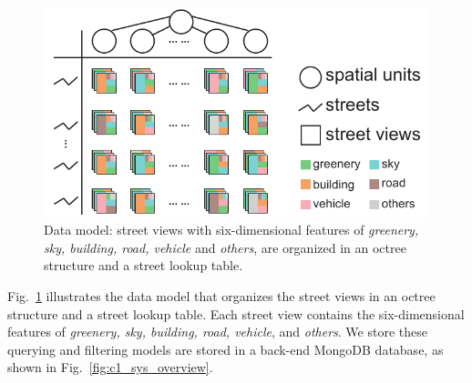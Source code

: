 \begin{figure}[h]
	\centering
	\includegraphics[width=0.8\columnwidth]{figure/streetvizor/fig4_data_model/data_model}
	\vspace{-3mm}
	\caption{Data model: street views with six-dimensional features of \textit{greenery, sky, building, road, vehicle} and \textit{others}, are organized in an octree structure and a street lookup table.}
	\vspace{-1mm}
	\label{fig:c1_data_model}
\end{figure}
\vspace*{-2mm}

Fig.~\ref{fig:c1_data_model} illustrates the data model that organizes the street views in an octree structure and a street lookup table.
Each street view contains the six-dimensional features of \textit{greenery, sky, building, road, vehicle}, and \textit{others}.
We store these querying and filtering models are stored in a back-end MongoDB database, as shown in Fig.~\ref{fig:c1_sys_overview}.
